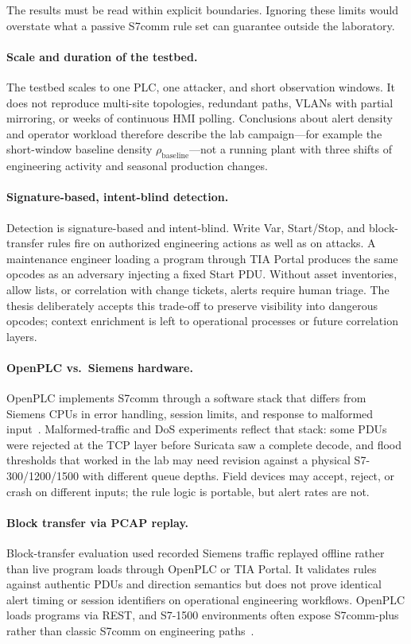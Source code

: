 \documentclass[../main.tex]{subfiles}
\begin{document}
The results must be read within explicit boundaries. Ignoring these limits would overstate what a passive S7comm rule set can guarantee outside the laboratory.

\paragraph{Scale and duration of the testbed.}
The testbed scales to one PLC, one attacker, and short observation windows. It does not reproduce multi-site topologies, redundant paths, VLANs with partial mirroring, or weeks of continuous HMI polling. Conclusions about alert density and operator workload therefore describe the lab campaign---for example the short-window baseline density $\rho_{\mathrm{baseline}}$---not a running plant with three shifts of engineering activity and seasonal production changes.

\paragraph{Signature-based, intent-blind detection.}
Detection is signature-based and intent-blind. Write Var, Start/Stop, and block-transfer rules fire on authorized engineering actions as well as on attacks. A maintenance engineer loading a program through TIA Portal produces the same opcodes as an adversary injecting a fixed Start PDU. Without asset inventories, allow lists, or correlation with change tickets, alerts require human triage. The thesis deliberately accepts this trade-off to preserve visibility into dangerous opcodes; context enrichment is left to operational processes or future correlation layers.

\paragraph{OpenPLC vs.\ Siemens hardware.}
OpenPLC implements S7comm through a software stack that differs from Siemens CPUs in error handling, session limits, and response to malformed input~\cite{openplc_s7_driver}. Malformed-traffic and DoS experiments reflect that stack: some PDUs were rejected at the TCP layer before Suricata saw a complete decode, and flood thresholds that worked in the lab may need revision against a physical S7-300/1200/1500 with different queue depths. Field devices may accept, reject, or crash on different inputs; the rule logic is portable, but alert rates are not.

\paragraph{Block transfer via PCAP replay.}
Block-transfer evaluation used recorded Siemens traffic replayed offline rather than live program loads through OpenPLC or TIA Portal. It validates rules against authentic PDUs and direction semantics but does not prove identical alert timing or session identifiers on operational engineering workflows. OpenPLC loads programs via REST, and S7-1500 environments often expose S7comm-plus rather than classic S7comm on engineering paths~\cite{industrialmonitordirect_s7comm_plus}.
\end{document}
